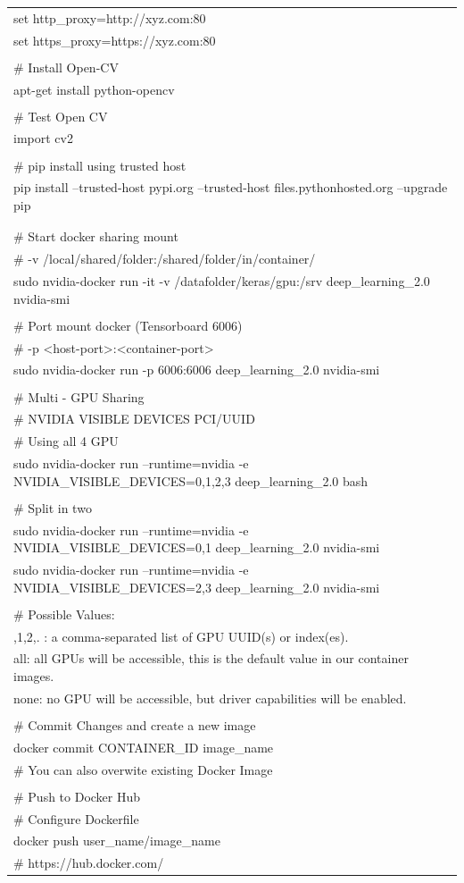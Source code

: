 \documentclass[a4paper]{article}
\begin{document}
{\begin{tabular} { >{\ttfamily}l  }
set http\_proxy=http://xyz.com:80\\
set https\_proxy=https://xyz.com:80\\
\\
\# Install Open-CV\\
apt-get install python-opencv\\
\\
\# Test Open CV\\
import cv2\\
\\
\# pip install using trusted host\\
pip install --trusted-host pypi.org --trusted-host files.pythonhosted.org --upgrade pip\\
\\
\\
\# Start docker sharing mount\\
\# -v /local/shared/folder:/shared/folder/in/container/\\
sudo nvidia-docker run -it -v /datafolder/keras/gpu:/srv deep\_learning\_2.0 nvidia-smi\\
\\
\# Port mount docker (Tensorboard 6006)\\
\# -p <host-port>:<container-port>\\
sudo nvidia-docker run -p 6006:6006 deep\_learning\_2.0 nvidia-smi\\
\\
\# Multi - GPU Sharing\\
\# NVIDIA VISIBLE DEVICES PCI/UUID \\
\# Using all 4 GPU\\
sudo nvidia-docker run --runtime=nvidia -e NVIDIA\_VISIBLE\_DEVICES=0,1,2,3 deep\_learning\_2.0 bash\\
\\
\# Split in two\\
sudo nvidia-docker run --runtime=nvidia -e NVIDIA\_VISIBLE\_DEVICES=0,1 deep\_learning\_2.0 nvidia-smi\\
sudo nvidia-docker run --runtime=nvidia -e NVIDIA\_VISIBLE\_DEVICES=2,3 deep\_learning\_2.0 nvidia-smi\\
\\
\# Possible Values:\\
0,1,2,. : a comma-separated list of GPU UUID(s) or index(es).\\
all: all GPUs will be accessible, this is the default value in our container images.\\
none: no GPU will be accessible, but driver capabilities will be enabled.\\
\\
\# Commit Changes and create a new image\\
docker commit CONTAINER\_ID image\_name\\
\# You can also overwite existing Docker Image\\
\\
\# Push to Docker Hub\\
\# Configure Dockerfile\\
docker push user\_name/image\_name\\
\# https://hub.docker.com/\\


\end{tabular}}
\end{document}
